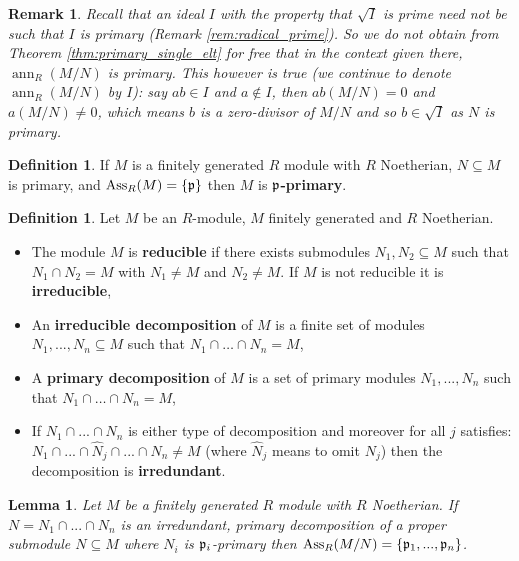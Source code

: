 \documentclass[12pt]{article}
\theoremstyle{plain}
\newtheorem{lemma}[thm]{Lemma}
\theoremstyle{definition}
\newtheorem{defn}[thm]{Definition} %
\newtheorem{remark}[thm]{Remark}
\begin{document}
\begin{remark}
\emph{Recall that an ideal $I$ with the property that $\sqrt{I}$ is prime need not be such that $I$ is primary (Remark \ref{rem:radical_prime}). So we do not obtain from Theorem \ref{thm:primary_single_elt} for free that in the context given there, $\operatorname{ann}_R(M/N)$ is primary. This however is true (we continue to denote $\operatorname{ann}_R(M/N)$ by $I$): say $ab \in I$ and $a \not\in I$, then $ab(M/N) = 0$ and $a(M/N) \neq 0$, which means $b$ is a zero-divisor of $M/N$ and so $b \in \sqrt{I}$ as $N$ is primary.}
\end{remark}
\begin{defn}
If $M$ is a finitely generated $R$ module with $R$ Noetherian, $N \subseteq M$ is primary, and $\operatorname{Ass}_R(M) = \lbrace \frak{p}\rbrace$ then $M$ is \textbf{$\frak{p}$-primary}.
\end{defn}
\begin{defn}
Let $M$ be an $R$-module, $M$ finitely generated and $R$ Noetherian. 
\begin{itemize}
    \item The module $M$ is \textbf{reducible} if there exists submodules $N_1,N_2 \subseteq M$ such that $N_1 \cap N_2 = M$ with $N_1 \neq M$ and $N_2 \neq M$. If $M$ is not reducible it is \textbf{irreducible},
    \item An \textbf{irreducible decomposition} of $M$ is a finite set of modules $N_1,...,N_n \subseteq M$ such that $N_1 \cap \hdots \cap N_n = M$,
    \item A \textbf{primary decomposition} of $M$ is a set of primary modules $N_1,...,N_n$ such that $N_1 \cap \hdots \cap N_n = M$,
    \item If $N_1 \cap ... \cap N_n$ is either type of decomposition and moreover for all $j$ satisfies: $N_1 \cap ... \cap \hat{N}_j \cap ... \cap N_n \neq M$ (where $\hat{N}_j$ means to omit $N_j$) then the decomposition is \textbf{irredundant}.
\end{itemize}
\end{defn}
\begin{lemma}
\label{lem:irred_primary_ass} Let $M$ be a finitely generated $R$ module with $R$ Noetherian. If $N = N_1 \cap ... \cap N_n$ is an irredundant, primary decomposition of a proper submodule $N \subseteq M$ where $N_i$ is $\frak{p}_i$-primary then $\operatorname{Ass}_R(M/N) = \lbrace \frak{p}_1,...,\frak{p}_n\rbrace$.
\end{lemma}
\end{document}
